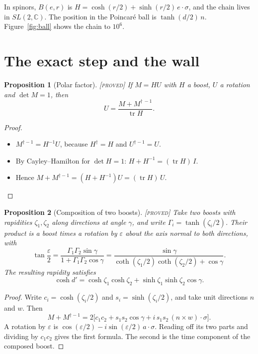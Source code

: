 \documentclass[11pt]{article}
\newtheorem{proposition}{Proposition}
\theoremstyle{definition}
\theoremstyle{remark}
\newcommand{\grade}[1]{\textsc{[#1]}}
\begin{document}
In spinors, $B(e,r)$ is $H=\cosh(r/2)+\sinh(r/2)\,e\cdot\sigma$, and the chain lives in $SL(2,\mathbb C)$. The position in the Poincar\'e ball is $\tanh(d/2)\,n$. Figure~\ref{fig:ball} shows the chain to $10^6$.

\section{The exact step and the wall}

\begin{proposition}[Polar factor] \grade{proved}
If $M=HU$ with $H$ a boost, $U$ a rotation and $\det M=1$, then
\[
U=\frac{M+M^{\dagger\,-1}}{\operatorname{tr}H}.
\]
\end{proposition}
\begin{proof}
\begin{itemize}
\item $M^{\dagger-1}=H^{-1}U$, because $H^\dagger=H$ and $U^{\dagger-1}=U$.
\item By Cayley--Hamilton for $\det H=1$: $H+H^{-1}=(\operatorname{tr}H)\,I$.
\item Hence $M+M^{\dagger-1}=(H+H^{-1})U=(\operatorname{tr}H)\,U$.
\end{itemize}
\end{proof}

\begin{proposition}[Composition of two boosts] \grade{proved}
Take two boosts with rapidities $\zeta_1,\zeta_2$ along directions at angle $\gamma$, and write $\Gamma_i=\tanh(\zeta_i/2)$. Their product is a boost times a rotation by $\varepsilon$ about the axis normal to both directions, with
\[
\tan\frac{\varepsilon}{2}=\frac{\Gamma_1\Gamma_2\sin\gamma}{1+\Gamma_1\Gamma_2\cos\gamma}
=\frac{\sin\gamma}{\coth(\zeta_1/2)\coth(\zeta_2/2)+\cos\gamma}.
\]
The resulting rapidity satisfies
\[
\cosh d'=\cosh\zeta_1\cosh\zeta_2+\sinh\zeta_1\sinh\zeta_2\cos\gamma .
\]
\end{proposition}
\begin{proof}
Write $c_i=\cosh(\zeta_i/2)$ and $s_i=\sinh(\zeta_i/2)$, and take unit directions $n$ and $w$. Then
\[
M+M^{\dagger-1}=2\bigl[c_1c_2+s_1s_2\cos\gamma+i\,s_1s_2\,(n\times w)\cdot\sigma\bigr].
\]
A rotation by $\varepsilon$ is $\cos(\varepsilon/2)-i\sin(\varepsilon/2)\,a\cdot\sigma$. Reading off its two parts and dividing by $c_1c_2$ gives the first formula. The second is the time component of the composed boost.
\end{proof}
\end{document}
